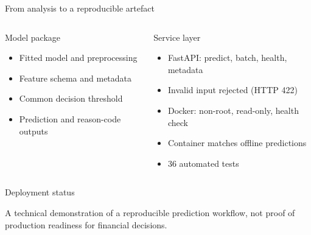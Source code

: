 \documentclass[aspectratio=169,10pt]{beamer}
\begin{document}
\begin{frame}{From analysis to a reproducible artefact}

\begin{columns}[T,onlytextwidth]


\begin{block}{Model package}

\begin{itemize}

    \item Fitted model and preprocessing

    \item Feature schema and metadata

    \item Common decision threshold

    \item Prediction and reason-code outputs

\end{itemize}

\end{block}


\begin{block}{Service layer}

\begin{itemize}

    \item FastAPI: predict, batch, health, metadata

    \item Invalid input rejected (HTTP 422)

    \item Docker: non-root, read-only, health check

    \item Container matches offline predictions

    \item 36 automated tests

\end{itemize}

\end{block}

\end{columns}

\begin{alertblock}{Deployment status}

A technical demonstration of a reproducible prediction workflow, not proof of production readiness for financial decisions.

\end{alertblock}

\end{frame}
\end{document}
